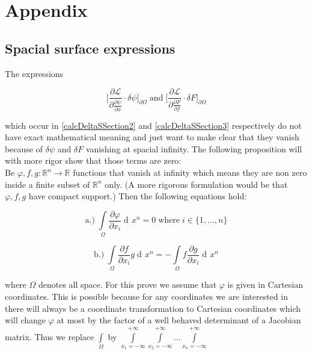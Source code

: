 \documentclass{article}
\DeclareMathOperator{\dd}{d\!}
\begin{document}
\section{Appendix}
\subsection{Spacial surface expressions} \label{SurfaceTerm}
The expressions

\begin{equation} \label{InexactExpressions}
\bigg[\frac{\partial \mathcal{L}}{\partial \frac{\partial \psi}{\partial x}} \cdot \delta \psi \bigg]
_{\partial \Omega} 
\; \text{and} \;
\bigg[\frac{\partial \mathcal{L}}{\partial \frac{\partial F}{\partial f}} \cdot \delta F \bigg]_{\partial \Omega}
\end{equation}

which occur in \ref{calcDeltaSSection2} and \ref{calcDeltaSSection3} respectively do not have exact mathematical meaning and just want to make clear that they vanish because of $\delta \psi$ and $\delta F$ vanishing at spacial infinity. The following proposition will with more rigor show that those terms are zero: \\

Be $\varphi,f,g: \mathbb{R}^n \to \mathbb{R}$ functions that vanish at infinity which means they are non zero inside a finite subset of $\mathbb{R}^n$ only. (A more rigorous formulation would be that $\varphi,f,g$ have compact support.) Then the following equations hold:

\begin{equation}
\text{a.)} \; \int\limits_\Omega \frac{\partial \varphi}{\partial x_i} \dd x^n = 0 \; \text{where} \; i \in \{1,...,n\}
\end{equation}

\begin{equation}
\text{b.)} \; \int\limits_\Omega \frac{\partial f}{\partial x_i} g \dd x^n 
= - \int\limits_\Omega f\frac{\partial g}{\partial x_i} \dd x^n
\end{equation}

where $\Omega$ denotes all space. 
For this prove we assume that $\varphi$ is given in Cartesian coordinates.
This is possible because for any coordinates we are interested in there will always be a coordinate transformation to Cartesian coordinates which will change $\varphi$ at most by the factor of a well behaved determinant of a Jacobian matrix. 
Thus we replace $\int\limits_\Omega$ by 
$\int\limits_{x_1=-\infty}^{+\infty}\int\limits_{x_2=-\infty}^{+\infty} ... \int\limits_{x_n=-\infty}^{+\infty}$
\\
\end{document}
